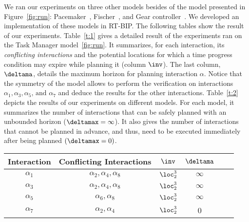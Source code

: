 We ran our experiments on three other models besides of the model presented in Figure~\ref{fig:run}: Pacemaker~\cite{pace}, Fischer~\cite{fisch}, and
Gear controller~\cite{gear}. We developed an implementation of these models in RT-BIP.
The following tables show the result of our experiments. Table~\ref{t:1} gives a detailed result of the experiments ran on 
the Task Manager model~\ref{fig:run}. It summarizes, for each interaction, its \emph{conflicting interactions} and the potential
locations for which a time progress condition may expire while planning it (column $\inv$). The last column, $\deltama$, details the maximum horizon for 
planning interaction $\alpha$. Notice that the symmetry of the model allows to perform the verification on interactions $\alpha_1,\alpha_3,\alpha_5\text{, and }
\alpha_7$ and deduce the results for the other interactions.
Table~\ref{t:2} depicts the results of our experiments on different models. For each model, it summarizes the number of interactions
that can be safely planned with an unbounded horizon ($\deltamax=\infty$). It also gives the number of interactions that cannot be planned in advance, and thus,
need to be executed immediately after being planned $(\deltamax=0)$.
   \vspace{-.8cm}
   \begin{table*}
     \caption{Detailed Results of the Task Manager Experiments}\label{t:1}
    \centering
    \vspace*{3mm}
    \begin{tabular}{| c || c | c | c | c | c |}
      \hline
      Interaction      &  Conflicting Interactions     & $\inv$       & $\deltama$  \\ \hline
      $\alpha_1$       & $\alpha_2,\alpha_4,\alpha_8$  & $\loc^3_2$   & $\infty$ \\\hline
      $\alpha_3$       & $\alpha_2,\alpha_4,\alpha_8$  & $\loc^3_2$   & $\infty$ \\\hline
      $\alpha_5$       & $\alpha_6,\alpha_8$           & $\loc^3_2$   & $\infty$\\\hline
      $\alpha_7$       & $\alpha_2,\alpha_4$           & $\loc^3_2$   & 0 \\\hline
    \end{tabular}
   \end{table*}
   \vspace{-1.5cm}

